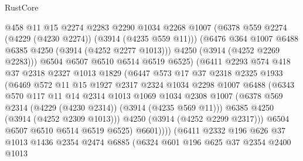 \begin{lexlean}{RustCore}
\begin{coremodule}
                      @458
                      @11
                      @15
                      @2274
                      @2283
                      @2290
                      @1034
                      @2268
                      @1007
                      (@6378 @559 @2274 (@4229 (@4230 @2274)) (@3914 (@4235 @559 @11)))
                      (@6476 @364 @1007 @6488 @6385 @4250 (@3914 (@4252 @2277 @1013)))
                      @4250
                      (@3914 (@4252 @2269 @2283)))
                    @6504
                    @6507
                    @6510
                    @6514
                    @6519
                    @6525)
                  (@6411
                    @2293
                    @574
                    @418
                    @37
                    @2318
                    @2327
                    @1013
                    @1829
                    (@6447
                      @573
                      @17
                      @37
                      @2318
                      @2325
                      @1933
                      (@6469
                        @572
                        @11
                        @15
                        @1927
                        @2317
                        @2324
                        @1034
                        @2298
                        @1007
                        @6488
                        (@6343
                          @570
                          @117
                          @11
                          @14
                          @2314
                          @1013
                          @1069
                          @1034
                          @2308
                          @1007
                          (@6378 @569 @2314 (@4229 (@4230 @2314)) (@3914 (@4235 @569 @11)))
                          @6385
                          @4250
                          (@3914 (@4252 @2309 @1013)))
                        @4250
                        (@3914 (@4252 @2299 @2317)))
                      @6504
                      @6507
                      @6510
                      @6514
                      @6519
                      @6525)
                    @6601))))
            (@6411
              @2332
              @196
              @626
              @37
              @1013
              @1436
              @2354
              @2474
              @6885
              (@6324
                @601
                @196
                @625
                @37
                @2354
                @2400
                @1013

\end{coremodule}
\end{lexlean}
